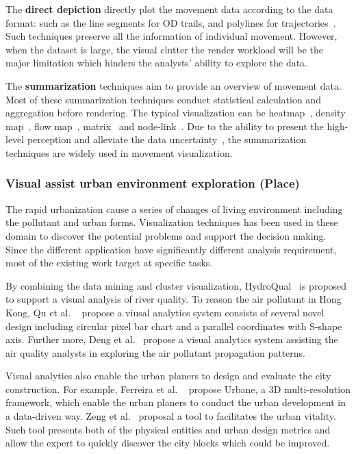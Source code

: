 The \textbf{direct depiction} directly plot the movement data according to the data format: such as the line segments for OD trails, and polylines for trajectories~\cite{andrienko2013visual, ferreira2013visual, kruger2013trajectorylenses}. Such techniques preserve all the information of individual movement. However, when the dataset is large, the visual clutter the render workload will be the major limitation which hinders the analysts’ ability to explore the data.

The \textbf{summarization} techniques aim to provide an overview of movement data. Most of these summarization techniques conduct statistical calculation and aggregation before rendering. The typical visualization can be heatmap~\cite{wilkinson2009history}, density map~\cite{lanir2014visualizing}, flow map~\cite{guo2014origin}, matrix~\cite{wood2010visualisation} and node-link~\cite{von2016mobilitygraphs}. Due to the ability to present the high-level perception and alleviate the data uncertainty~\cite{andrienko2013visual}, the summarization techniques are widely used in movement visualization. 

\subsubsection{Visual assist urban environment exploration (Place)}
The rapid urbanization cause a series of changes of living environment including the pollutant and urban forms. Visualization techniques has been used in these domain to discover the potential problems and support the decision making. Since the different application have significantly different analysis requirement, most of the existing work target at specific tasks.  

By combining the data mining and cluster visualization, HydroQual~\cite{accorsi2014hydroqual} is proposed to support a visual analysis of river quality. 
To reason the air pollutant in Hong Kong, Qu et al. ~\cite{qu2007visual} propose a viusal analytics system consists of several novel design including  circular pixel bar chart and a parallel coordinates with S-shape axis.  Further more, Deng et al.~\cite{deng2019airvis} propose a visual analytics system assisting the air quality analysts in exploring the air pollutant propagation patterns. 

Visual analytics also enable the urban planers to design and evaluate the city construction. For example, Ferreira et al. ~\cite{ferreira2015urbane} propose Urbane, a 3D multi-resolution framework, which enable the urban planers to conduct the urban development in a data-driven way. Zeng et al.~\cite{zeng2018vitalvizor} proposal a tool to facilitates the urban vitality. Such tool presents both of the physical entities and urban design metrics and allow the expert to quickly discover the city blocks which could be improved.
